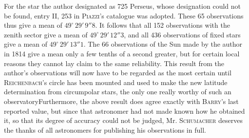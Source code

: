 \noindent{}For the star the author designated as 725 Perseus, whose designation could not be found, entry II, 253 in \textsc{Piazzi}'s catalogue was adopted. These 65 observations thus give a mean of $49^\circ\,29'\,9''8$. It follows that all 152 observations with the zenith sector give a mean of $49^\circ\,29'\,12''3$, and all 436 observations of fixed stars give a mean of $49^\circ\,29'\,13''1$. The 66 observations of the Sun made by the author in 1814 give a mean only a few tenths of a second greater, but for certain local reasons they cannot lay claim to the same reliability. This result from the author's observations will now have to be regarded as the most certain until \textsc{Reichenbach}'s circle has been mounted and used to make the new latitude determination from circumpolar stars, the only one really worthy of such an observatory\enspace Furthermore, the above result does agree exactly with \textsc{Barry}'s last reported value, but since that astronomer had not made known how he obtained it, so that its degree of accuracy could not be judged, Mr. \textsc{Schumacher} deserves the thanks of all astronomers for publishing his observations in full.
\par\clearpage\endgroup
